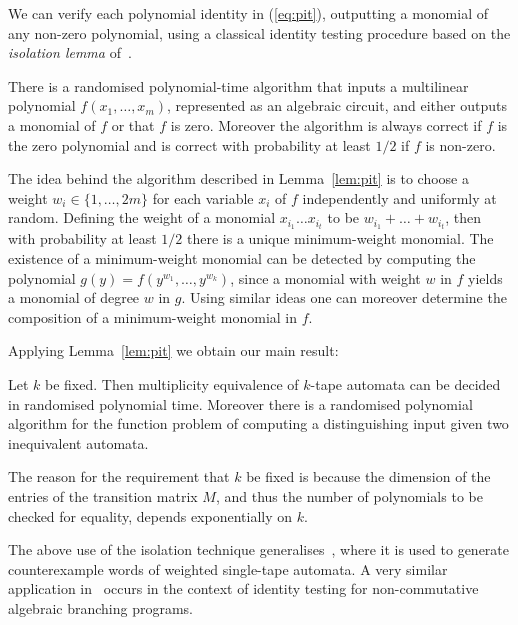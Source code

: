 \documentclass[runningheads]{llncs}
\begin{document}
We can verify each polynomial identity in (\ref{eq:pit}), outputting a
monomial of any non-zero polynomial, using a classical identity testing
procedure based on the \emph{isolation lemma} of~\cite{MVV87}.

\begin{lemma}
  There is a randomised polynomial-time algorithm that inputs a
  multilinear polynomial $f(x_1,\ldots,x_m)$, represented as an
  algebraic circuit, and either outputs a monomial of $f$ or that $f$
  is zero.  Moreover the algorithm is always correct if $f$ is the
  zero polynomial and is correct with probability at least $1/2$ if
  $f$ is non-zero.
\label{lem:pit}
\end{lemma}

The idea behind the algorithm described in Lemma~\ref{lem:pit} is to
choose a weight $w_i \in \{1,\ldots,2m\}$ for each variable $x_i$ of
$f$ independently and uniformly at random.  Defining the weight of a
monomial $x_{i_1}\ldots x_{i_t}$ to be $w_{i_1}+\ldots+w_{i_t}$, then
with probability at least $1/2$ there is a unique minimum-weight
monomial.  The existence of a minimum-weight monomial can be detected
by computing the polynomial $g(y)=f(y^{w_1},\ldots,y^{w_k})$, since a
monomial with weight $w$ in $f$ yields a monomial of degree $w$ in
$g$.  Using similar ideas one can moreover determine the composition of
a minimum-weight monomial in $f$.

Applying Lemma~\ref{lem:pit} we obtain our main result:
\begin{theorem}
Let $k$ be fixed.  Then multiplicity equivalence of $k$-tape automata can
be decided in randomised polynomial time.  Moreover there is a
randomised polynomial algorithm for the function problem of computing
a distinguishing input given two inequivalent automata.
\label{thm:main}
\end{theorem}

The reason for the requirement that $k$ be fixed is because the
dimension of the entries of the transition matrix $M$, and thus the
number of polynomials to be checked for equality, depends
exponentially on $k$.

The above use of the isolation technique
generalises~\cite{KieferMOWW13}, where it is used to generate
counterexample words of weighted single-tape automata.  A very similar
application in~\cite{ArvindM08} occurs in the context of identity
testing for non-commutative algebraic branching programs.
\end{document}
